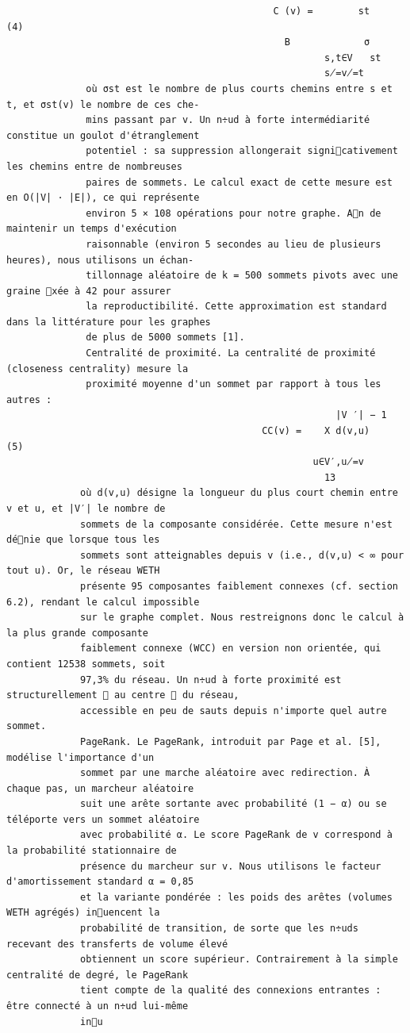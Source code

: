 \documentclass[12pt]{article}
\begin{document}
\begin{verbatim}
                                               C (v) =        st                                 (4)
                                                 B             σ
                                                        s,t∈V   st
                                                        s̸=v̸=t
              où σst est le nombre de plus courts chemins entre s et t, et σst(v) le nombre de ces che-
              mins passant par v. Un n÷ud à forte intermédiarité constitue un goulot d'étranglement
              potentiel : sa suppression allongerait signicativement les chemins entre de nombreuses
              paires de sommets. Le calcul exact de cette mesure est en O(|V| · |E|), ce qui représente
              environ 5 × 108 opérations pour notre graphe. An de maintenir un temps d'exécution
              raisonnable (environ 5 secondes au lieu de plusieurs heures), nous utilisons un échan-
              tillonnage aléatoire de k = 500 sommets pivots avec une graine xée à 42 pour assurer
              la reproductibilité. Cette approximation est standard dans la littérature pour les graphes
              de plus de 5000 sommets [1].
              Centralité de proximité. La centralité de proximité (closeness centrality) mesure la
              proximité moyenne d'un sommet par rapport à tous les autres :
                                                          |V ′| − 1
                                             CC(v) =    X d(v,u)                                 (5)
                                                      u∈V′,u̸=v
                                                        13
             où d(v,u) désigne la longueur du plus court chemin entre v et u, et |V′| le nombre de
             sommets de la composante considérée. Cette mesure n'est dénie que lorsque tous les
             sommets sont atteignables depuis v (i.e., d(v,u) < ∞ pour tout u). Or, le réseau WETH
             présente 95 composantes faiblement connexes (cf. section 6.2), rendant le calcul impossible
             sur le graphe complet. Nous restreignons donc le calcul à la plus grande composante
             faiblement connexe (WCC) en version non orientée, qui contient 12538 sommets, soit
             97,3% du réseau. Un n÷ud à forte proximité est structurellement  au centre  du réseau,
             accessible en peu de sauts depuis n'importe quel autre sommet.
             PageRank. Le PageRank, introduit par Page et al. [5], modélise l'importance d'un
             sommet par une marche aléatoire avec redirection. À chaque pas, un marcheur aléatoire
             suit une arête sortante avec probabilité (1 − α) ou se téléporte vers un sommet aléatoire
             avec probabilité α. Le score PageRank de v correspond à la probabilité stationnaire de
             présence du marcheur sur v. Nous utilisons le facteur d'amortissement standard α = 0,85
             et la variante pondérée : les poids des arêtes (volumes WETH agrégés) inuencent la
             probabilité de transition, de sorte que les n÷uds recevant des transferts de volume élevé
             obtiennent un score supérieur. Contrairement à la simple centralité de degré, le PageRank
             tient compte de la qualité des connexions entrantes : être connecté à un n÷ud lui-même
             inu
\end{verbatim}
\end{document}
